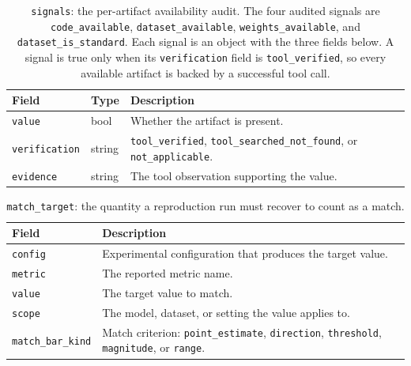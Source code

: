 \documentclass{article} %
\begin{document}
\begin{table}[t]
\caption{\texttt{signals}: the per-artifact availability audit. The four
audited signals are \texttt{code\_available}, \texttt{dataset\_available},
\texttt{weights\_available}, and \texttt{dataset\_is\_standard}. Each signal
is an object with the three fields below. A signal is true only when its
\texttt{verification} field is \texttt{tool\_verified}, so every available
artifact is backed by a successful tool call.}
\label{tab:schema-signals}
\begin{center}
\small
\begin{tabular}{@{}lll@{}}
\toprule
Field & Type & Description \\
\midrule
\texttt{value} & bool & Whether the artifact is present. \\
\texttt{verification} & string & \texttt{tool\_verified}, \texttt{tool\_searched\_not\_found}, or \texttt{not\_applicable}. \\
\texttt{evidence} & string & The tool observation supporting the value. \\
\bottomrule
\end{tabular}
\end{center}
\end{table}

\begin{table}[t]
\caption{\texttt{match\_target}: the quantity a reproduction run must recover
to count as a match.}
\label{tab:schema-matchtarget}
\begin{center}
\small
\begin{tabular}{@{}lp{9.8cm}@{}}
\toprule
Field & Description \\
\midrule
\texttt{config} & Experimental configuration that produces the target value. \\
\texttt{metric} & The reported metric name. \\
\texttt{value} & The target value to match. \\
\texttt{scope} & The model, dataset, or setting the value applies to. \\
\texttt{match\_bar\_kind} & Match criterion: \texttt{point\_estimate}, \texttt{direction}, \texttt{threshold}, \texttt{magnitude}, or \texttt{range}. \\
\bottomrule
\end{tabular}
\end{center}
\end{table}
\end{document}
